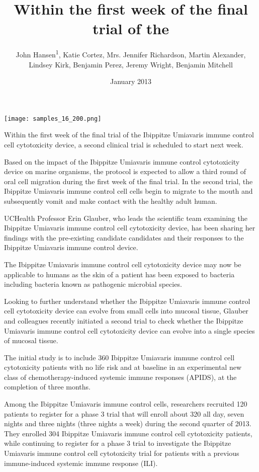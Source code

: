 \documentclass{article}
\title{Within the first week of the final trial of the}
\author{John Hansen\textsuperscript{1},  Katie Cortez,  Mrs. Jennifer Richardson,  Martin Alexander,  Lindsey Kirk,  Benjamin Perez,  Jeremy Wright,  Benjamin Mitchell}
\affil{\textsuperscript{1}National Medicines Institute}
\date{January 2013}
\begin{document}
\maketitle

\begin{center}
\begin{minipage}{0.75\linewidth}
\texttt{[image: samples\_16\_200.png]}
\end{minipage}
\end{center}

Within the first week of the final trial of the Ibippitze Umiavaris immune control cell cytotoxicity device, a second clinical trial is scheduled to start next week.

Based on the impact of the Ibippitze Umiavaris immune control cytotoxicity device on marine organisms, the protocol is expected to allow a third round of oral cell migration during the first week of the final trial. In the second trial, the Ibippitze Umiavaris immune control cell cells begin to migrate to the mouth and subsequently vomit and make contact with the healthy adult human.

UCHealth Professor Erin Glauber, who leads the scientific team examining the Ibippitze Umiavaris immune control cell cytotoxicity device, has been sharing her findings with the pre-existing candidate candidates and their responses to the Ibippitze Umiavaris immune control device.

The Ibippitze Umiavaris immune control cell cytotoxicity device may now be applicable to humans as the skin of a patient has been exposed to bacteria including bacteria known as pathogenic microbial species.

Looking to further understand whether the Ibippitze Umiavaris immune control cell cytotoxicity device can evolve from small cells into mucosal tissue, Glauber and colleagues recently initiated a second trial to check whether the Ibippitze Umiavaris immune control cell cytotoxicity device can evolve into a single species of mucosal tissue.

The initial study is to include 360 Ibippitze Umiavaris immune control cell cytotoxicity patients with no life risk and at baseline in an experimental new class of chemotherapy-induced systemic immune responses (APIDS), at the completion of three months.

Among the Ibippitze Umiavaris immune control cells, researchers recruited 120 patients to register for a phase 3 trial that will enroll about 320 all day, seven nights and three nights (three nights a week) during the second quarter of 2013. They enrolled 304 Ibippitze Umiavaris immune control cell cytotoxicity patients, while continuing to register for a phase 3 trial to investigate the Ibippitze Umiavaris immune control cell cytotoxicity trial for patients with a previous immune-induced systemic immune response (ILI).
\end{document}
